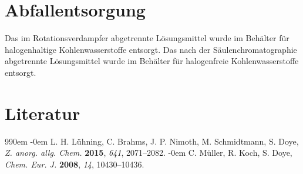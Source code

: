 \documentclass[12pt]{article}
\begin{document}
\begin{onehalfspace}
\section{Abfallentsorgung}
Das im Rotationsverdampfer abgetrennte Lösungsmittel wurde im Behälter für halogenhaltige Kohlenwasserstoffe entsorgt.
Das nach der Säulenchromatographie abgetrennte Lösungsmittel wurde im Behälter für halogenfreie Kohlenwasserstoffe entsorgt.
\section{Literatur}

\renewcommand{\section}[2]{}%
\def\bibindent{0em}
\begin{thebibliography}{99\kern\bibindent}
\makeatletter
\let\old@biblabel\@biblabel
\def\@biblabel#1{\old@biblabel{#1}\kern\bibindent}
\let\old@bibitem\bibitem
\def\bibitem#1{\old@bibitem{#1}\leavevmode\kern-\bibindent}
\makeatother
{}
L. H. Lühning, C. Brahms, J. P. Nimoth, M. Schmidtmann, S. Doye, \textit{Z. anorg. allg. Chem.} \textbf{2015}, \textit{641}, 2071–2082.
C. Müller, R. Koch, S. Doye, \textit{Chem. Eur. J.} \textbf{2008}, \textit{14}, 10430–10436.
\end{thebibliography}
\end{onehalfspace}
\end{document}
